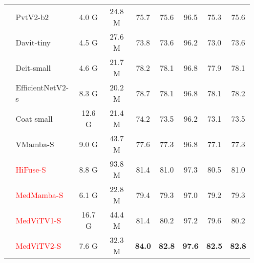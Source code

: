 \documentclass[times,twocolumn,final]{elsarticle}
\begin{document}
\begin{table*}[!t]
\begin{center}
{\begin{tabular}{c|l|ccccccc}
&PvtV2-b2
&4.0 G	&24.8 M	&75.7	&75.6	&96.5	&75.3	&75.6	\\

&Davit-tiny
&4.5 G	&27.6 M	&73.8	&73.6	&96.2	&73.0	&73.6	\\

&Deit-small
&4.6 G	&21.7 M	&78.2	&78.1	&96.8	&77.9	&78.1	\\

&EfficientNetV2-s
&8.3 G	&20.2 M	&78.7	&78.1	&96.8	&78.1	&78.2	\\

&Coat-small
&12.6 G	&21.4 M	&74.2	&73.5	&96.2	&73.1	&73.5	\\
&{VMamba-S}
&9.0 G	&43.7 M	&77.6	&77.3	&96.8	&77.1	&77.3	\\
&\textcolor{red}{HiFuse-S}
&8.8 G	&93.8 M	&81.4	&81.0	&97.3	&80.5	&81.0	\\
&\textcolor{red}{MedMamba-S}   &6.1 G	&22.8 M	&79.4	&79.3	&97.0	&79.2	&79.3	\\
&\textcolor{red}{MedViTV1-S}   &16.7 G	&44.4 M	&81.4	&80.2	&97.2	&79.6	&80.2	\\
\rowcolor{gray!20}
\cellcolor{white}&\textcolor{red}{MedViTV2-S}   & 7.6 G	& 32.3 M	&\textbf{84.0}	&\textbf{82.8}	&\textbf{97.6}	&\textbf{82.5}	&\textbf{82.8}	\\
\hline\bottomrule
		\end{tabular}}
		\label{tab4}
	\end{center}
\end{table*}
\end{document}
